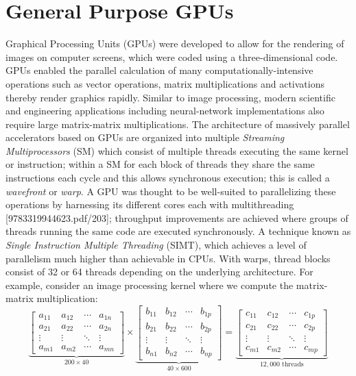 \documentclass[10pt]{article}[draft]
\begin{document}
\section{General Purpose GPUs}
Graphical Processing Units (GPUs) were developed to allow for the  rendering of images on computer screens, which were  coded using a three-dimensional code. GPUs enabled the parallel calculation of many computationally-intensive operations such as vector operations, matrix multiplications and activations thereby render graphics rapidly. Similar to image processing, modern scientific and engineering applications including neural-network implementations  also require large matrix-matrix multiplications.  The architecture of massively parallel accelerators based on GPUs are organized into multiple \emph{Streaming Multiprocessors} (SM) which consist of multiple threads executing the same kernel or instruction; within a SM for each block of threads they share the same instructions each cycle and this allows synchronous execution; this is called a \emph{wavefront} or \emph{warp}.  A GPU was thought to be well-suited to parallelizing these operations by harnessing its different cores each with multithreading [9783319944623.pdf/203]; throughput improvements are achieved where groups of threads running the same code are  executed synchronously. A technique known as \emph{Single Instruction Multiple Threading} (SIMT), which achieves a level of parallelism much higher than achievable in CPUs. With warps, thread blocks consist of 32 or 64 threads depending on the underlying architecture. For example, consider an image processing kernel where we compute the matrix-matrix multiplication:
\begin{equation*}
	\underbrace{\begin{bmatrix}
		a_{11} & a_{12} & \cdots & a_{1n}\\
		a_{21} & a_{22} & \cdots & a_{2n}\\ 
		\vdots & \vdots & \ddots & \vdots\\ 
		a_{m1} & a_{m2} & \cdots & a_{mn} 
	\end{bmatrix}}_{200 \times 40}
	\times
	\underbrace{\begin{bmatrix}
		b_{11} & b_{12} & \cdots & b_{1p}\\
		b_{21} & b_{22} & \cdots & b_{2p}\\ 
		\vdots & \vdots & \ddots & \vdots\\ 
		b_{n1} & b_{n2} & \cdots & b_{np} 
	\end{bmatrix}}_{40 \times 600}
	=
	\underbrace{\begin{bmatrix}
		c_{11} & c_{12} & \cdots & c_{1p}\\
		c_{21} & c_{22} & \cdots & c_{2p}\\ 
		\vdots & \vdots & \ddots & \vdots\\ 
		c_{m1} & c_{m2} & \cdots & c_{mp} 
	\end{bmatrix}}_{12,000 \text{ threads}}
\end{equation*}
\end{document}
